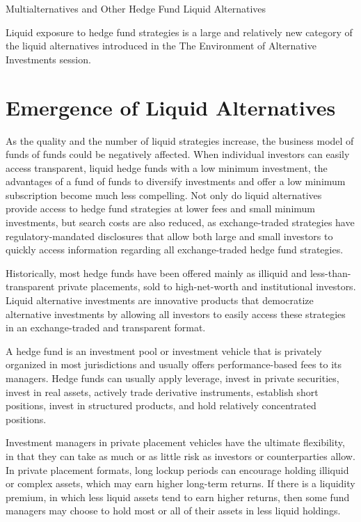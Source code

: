 \documentclass[11pt]{article}
\begin{document}
Multialternatives and Other Hedge Fund Liquid Alternatives

Liquid exposure to hedge fund strategies is a large and relatively new category of the liquid alternatives introduced in the The Environment of Alternative Investments session.

\section*{Emergence of Liquid Alternatives}
As the quality and the number of liquid strategies increase, the business model of funds of funds could be negatively affected. When individual investors can easily access transparent, liquid hedge funds with a low minimum investment, the advantages of a fund of funds to diversify investments and offer a low minimum subscription become much less compelling. Not only do liquid alternatives provide access to hedge fund strategies at lower fees and small minimum investments, but search costs are also reduced, as exchange-traded strategies have regulatory-mandated disclosures that allow both large and small investors to quickly access information regarding all exchange-traded hedge fund strategies.

Historically, most hedge funds have been offered mainly as illiquid and less-than-transparent private placements, sold to high-net-worth and institutional investors. Liquid alternative investments are innovative products that democratize alternative investments by allowing all investors to easily access these strategies in an exchange-traded and transparent format.

A hedge fund is an investment pool or investment vehicle that is privately organized in most jurisdictions and usually offers performance-based fees to its managers. Hedge funds can usually apply leverage, invest in private securities, invest in real assets, actively trade derivative instruments, establish short positions, invest in structured products, and hold relatively concentrated positions.

Investment managers in private placement vehicles have the ultimate flexibility, in that they can take as much or as little risk as investors or counterparties allow. In private placement formats, long lockup periods can encourage holding illiquid or complex assets, which may earn higher long-term returns. If there is a liquidity premium, in which less liquid assets tend to earn higher returns, then some fund managers may choose to hold most or all of their assets in less liquid holdings.
\end{document}
